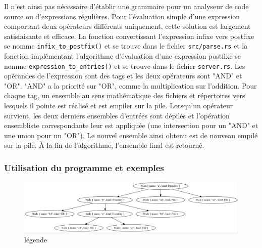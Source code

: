 \bigbreak
Il n'est ainsi pas nécessaire d'établir une grammaire pour un analyseur de code source ou d'expressions 
régulières. Pour l'évaluation simple d'une expression comportant deux opérateurs différents uniquement, 
cette solution est largement satisfaisante et efficace. La fonction convertissant l'expression 
infixe vers postfixe se nomme \texttt{infix_to_postfix()} et se trouve dans le fichier 
\texttt{src/parse.rs} et la fonction implémentant l'algorithme d'évaluation d'une 
expression postfixe se nomme \texttt{expression_to_entries()} et se trouve dans le fichier 
\texttt{server.rs}. Les opérandes de l'expression sont des tags et les deux opérateurs sont 
"AND" et "OR". "AND" a la priorité sur "OR", comme la multiplication sur l'addition. Pour chaque tag, 
un ensemble au sens mathématique des fichiers et répertoires vers lesquels il pointe est réalisé et 
est empiler sur la pile. Lorsqu'un opérateur survient, les deux derniers ensembles d'entrées sont 
dépilés et l'opération ensembliste correspondante leur est appliquée (une intersection pour un "AND" 
et une union pour un "OR"). Le nouvel ensemble ainsi obtenu est de nouveau empilé sur la pile. 
À la fin de l'algorithme, l'ensemble final est retourné.

\subsubsection{Utilisation du programme et exemples}
\begin{figure}
    \begin{center}
        \includegraphics[width=1\textwidth]{images/graph.jpg}
    \end{center}
    \caption{légende}
    \label{label}
\end{figure}